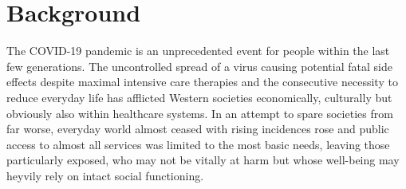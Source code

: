 \documentclass{bmcart}
\begin{document}
\begin{frontmatter}
\begin{abstractbox}
			
			\begin{keyword}				%
			\end{keyword}
			
			
		\end{abstractbox}
		
	\end{frontmatter}
	
	
	
	\section*{Background}
	The COVID-19 pandemic is an unprecedented event for people within the last few generations. The uncontrolled spread of a virus causing potential fatal side effects despite maximal intensive care therapies and the consecutive necessity to reduce everyday life has afflicted Western societies economically, culturally but obviously also within healthcare systems. In an attempt to spare societies from far worse, everyday world almost ceased with rising incidences rose and public access to almost all services was limited to the most basic needs, leaving those particularly exposed, who may not be vitally at harm but whose well-being may heyvily rely on intact social functioning.
\end{document}
